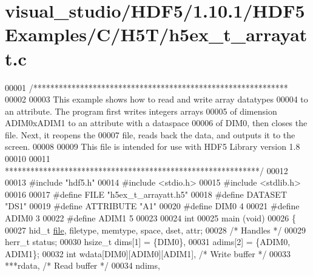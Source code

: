 \hypertarget{visual__studio_2_h_d_f5_21_810_81_2_h_d_f5_examples_2_c_2_h5_t_2h5ex__t__arrayatt_8c_source}{}\section{visual\+\_\+studio/\+H\+D\+F5/1.10.1/\+H\+D\+F5\+Examples/\+C/\+H5\+T/h5ex\+\_\+t\+\_\+arrayatt.c}
\label{visual__studio_2_h_d_f5_21_810_81_2_h_d_f5_examples_2_c_2_h5_t_2h5ex__t__arrayatt_8c_source}

\begin{DoxyCode}
00001 \textcolor{comment}{/************************************************************}
00002 \textcolor{comment}{}
00003 \textcolor{comment}{  This example shows how to read and write array datatypes}
00004 \textcolor{comment}{  to an attribute.  The program first writes integers arrays}
00005 \textcolor{comment}{  of dimension ADIM0xADIM1 to an attribute with a dataspace}
00006 \textcolor{comment}{  of DIM0, then closes the  file.  Next, it reopens the}
00007 \textcolor{comment}{  file, reads back the data, and outputs it to the screen.}
00008 \textcolor{comment}{}
00009 \textcolor{comment}{  This file is intended for use with HDF5 Library version 1.8}
00010 \textcolor{comment}{}
00011 \textcolor{comment}{ ************************************************************/}
00012 
00013 \textcolor{preprocessor}{#include "hdf5.h"}
00014 \textcolor{preprocessor}{#include <stdio.h>}
00015 \textcolor{preprocessor}{#include <stdlib.h>}
00016 
00017 \textcolor{preprocessor}{#define FILE            "h5ex\_t\_arrayatt.h5"}
00018 \textcolor{preprocessor}{#define DATASET         "DS1"}
00019 \textcolor{preprocessor}{#define ATTRIBUTE       "A1"}
00020 \textcolor{preprocessor}{#define DIM0            4}
00021 \textcolor{preprocessor}{#define ADIM0           3}
00022 \textcolor{preprocessor}{#define ADIM1           5}
00023 
00024 \textcolor{keywordtype}{int}
00025 main (\textcolor{keywordtype}{void})
00026 \{
00027     hid\_t       \hyperlink{structfile}{file}, filetype, memtype, space, dset, attr;
00028                                                 \textcolor{comment}{/* Handles */}
00029     herr\_t      status;
00030     hsize\_t     dims[1] = \{DIM0\},
00031                 adims[2] = \{ADIM0, ADIM1\};
00032     \textcolor{keywordtype}{int}         wdata[DIM0][ADIM0][ADIM1],      \textcolor{comment}{/* Write buffer */}
00033                 ***rdata,                       \textcolor{comment}{/* Read buffer */}
00034                 ndims,

\end{DoxyCode}

